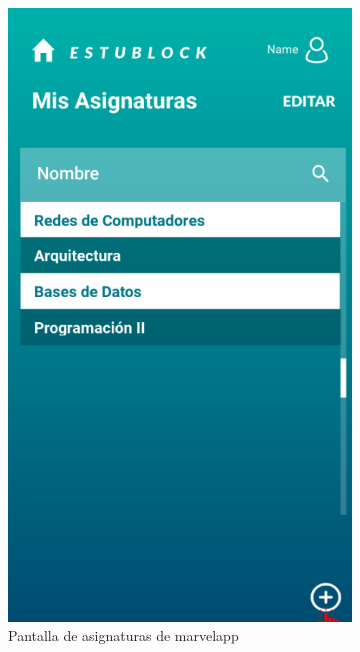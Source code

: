 \begin{figure}[hbt]
	\centering
	\begin{subfigure}[b]{0.4\linewidth}
		\centering
        \includegraphics[width=0.7\linewidth]{figs/Desarrollo/Interfaz/marvel_lista_asignaturas}
        \caption[Marvel Asignaturas]{Pantalla de asignaturas de marvelapp}
	\end{subfigure} 
	\begin{subfigure}[b]{0.4\linewidth}
		\centering

\end{subfigure}
\end{figure}
